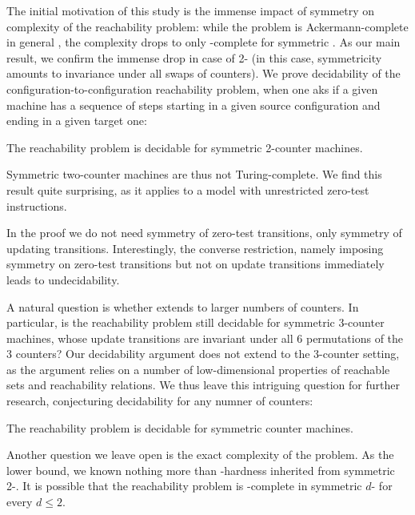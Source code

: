 The initial motivation of this study is the immense impact of symmetry
on complexity of the \vass reachability problem:
while the problem is {\sc Ackermann}-complete in general \cite{LS19,CO21,L21},
the complexity drops to
only \pspace-complete for symmetric \vass \cite{KL25}.
As our main result, we confirm the immense drop in case of 
2-
(in this case, symmetricity amounts to invariance under all swaps of 
counters).
We prove decidability of the configuration-to-configuration reachability
problem, when one aks if a given machine has a sequence of steps
starting in a given source configuration and ending in
a given target one:

\begin{theorem} \label{thm:main}
The reachability problem  is decidable for symmetric 2-counter machines.
\end{theorem}

Symmetric two-counter machines are thus not Turing-complete.
We find this result quite surprising, as it applies to a model
with unrestricted zero-test instructions.

\begin{remark}
In the proof we do not need symmetry of zero-test transitions,
only symmetry of updating transitions.
Interestingly, the converse restriction, namely imposing symmetry on
zero-test transitions but not on update transitions immediately 
leads to undecidability.
\end{remark}

A natural question is whether  extends to larger numbers of
counters. 
In particular, is the reachability problem still decidable
for symmetric 3-counter machines, whose update transitions are invariant
under all 6 permutations of the 3 counters?
Our decidability argument does not extend to the 3-counter setting, 
as the argument relies on a
number of low-dimensional properties of reachable sets and reachability
relations.
We thus leave this intriguing question for further research, conjecturing
decidability for any numner of counters:

\begin{conjecture}
The reachability problem  is decidable for symmetric counter machines.
\end{conjecture}

Another question we leave open is the exact complexity of the problem.
As the lower bound, we known nothing more than 
\pspace-hardness inherited from symmetric 2-\vass \cite{KL24}.
It is possible that the reachability problem is \pspace-complete
in symmetric $d$- for every $d\leq 2$.

